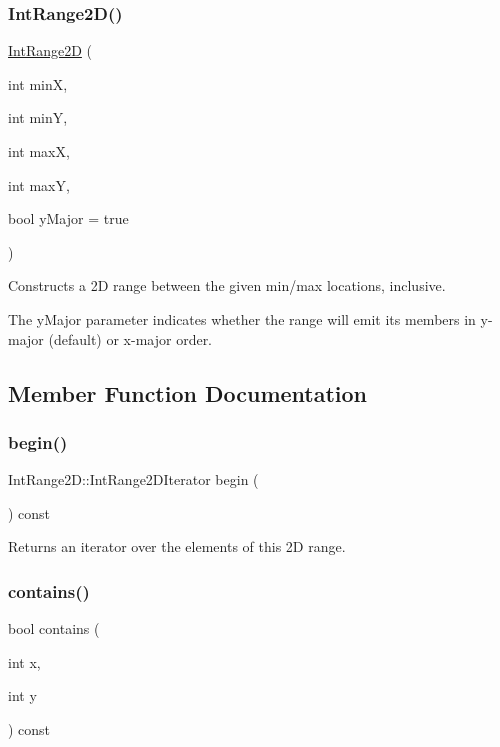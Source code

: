 \subsubsection{\texorpdfstring{Int\+Range2\+D()}{IntRange2D()}\hspace{0.1cm}{\footnotesize\ttfamily [2/2]}}
{\footnotesize\ttfamily \mbox{\hyperlink{classIntRange2D}{Int\+Range2D}} (\begin{DoxyParamCaption}\item[{int}]{minX,  }\item[{int}]{minY,  }\item[{int}]{maxX,  }\item[{int}]{maxY,  }\item[{bool}]{y\+Major = {\ttfamily true} }\end{DoxyParamCaption})}



Constructs a 2D range between the given min/max locations, inclusive. 

The y\+Major parameter indicates whether the range will emit its members in y-\/major (default) or x-\/major order. 

\subsection{Member Function Documentation}
\mbox{\label{classIntRange2D_a5840f252f949c3f9c0bd1085250a8615}} 
\subsubsection{\texorpdfstring{begin()}{begin()}}
{\footnotesize\ttfamily Int\+Range2\+D\+::\+Int\+Range2\+D\+Iterator begin (\begin{DoxyParamCaption}{ }\end{DoxyParamCaption}) const}



Returns an iterator over the elements of this 2D range. 

\mbox{\label{classIntRange2D_a39725eb73188fbf2a4b790b1a6849815}} 
\subsubsection{\texorpdfstring{contains()}{contains()}\hspace{0.1cm}{\footnotesize\ttfamily [1/2]}}
{\footnotesize\ttfamily bool contains (\begin{DoxyParamCaption}\item[{int}]{x,  }\item[{int}]{y }\end{DoxyParamCaption}) const}



